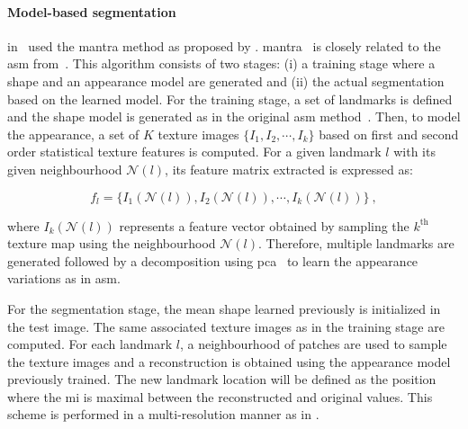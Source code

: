 \paragraph{Model-based segmentation}
\citeauthor{Viswanath2009} in~\cite{Viswanath2008a,Viswanath2009} used the \ac{mantra} method as proposed by \citeauthor{Toth2008}.
\ac{mantra}~\cite{Toth2008} is closely related to the \ac{asm} from~\cite{Cootes1995}.
This algorithm consists of two stages: (i) a training stage where a shape and an appearance model are generated and (ii) the actual segmentation based on the learned model. 
For the training stage, a set of landmarks is defined and the shape model is generated as in the original \ac{asm} method~\cite{Cootes1995}.
Then, to model the appearance, a set of $K$ texture images $\{I_1,I_2,\cdots,I_k\}$ based on first and second order statistical texture features is computed.
For a given landmark $l$ with its given neighbourhood $\mathcal{N}(l)$, its feature matrix extracted is expressed as:

\begin{equation}
  f_l = \{ I_1(\mathcal{N}(l)), I_2(\mathcal{N}(l)), \cdots, I_k(\mathcal{N}(l)) \} \ ,
  \label{eq:mantra1}
\end{equation}

\noindent where $I_k(\mathcal{N}(l))$ represents a feature vector obtained by sampling the $k^{\text{th}}$ texture map using the neighbourhood $\mathcal{N}(l)$.
Therefore, multiple landmarks are generated followed by a decomposition using \ac{pca}~\cite{Pearson1901} to learn the appearance variations as in \ac{asm}.

For the segmentation stage, the mean shape learned previously is initialized in the test image.
The same associated texture images as in the training stage are computed.
For each landmark $l$, a neighbourhood of patches are used to sample the texture images and a reconstruction is obtained using the appearance model previously trained.
The new landmark location will be defined as the position where the \ac{mi} is maximal between the reconstructed and original values.
This scheme is performed in a multi-resolution manner as in \cite{Cootes1995}.

